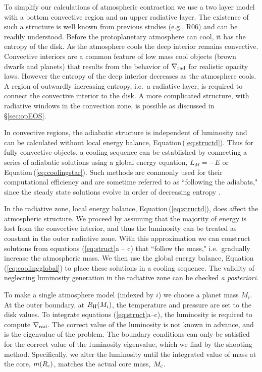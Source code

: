 \documentclass[apj, numberedappendix]{emulateapj}
\newcommand{\Eq}[1]{Equation\,(\ref{#1})}
\newcommand{\delrad}{\nabla_{\rm rad}}
\newcommand{\RH}{R_{\rm H}}
\newcommand{\co}{_{\rm c}}
\begin{document}
To simplify our calculations of atmospheric contraction we use a two layer model with a bottom convective region and an upper radiative layer.   The existence of such a structure is well known from previous studies (e.g., R06) and can be readily understood.  Before the protoplanetary atmosphere can cool, it has the entropy of the disk.  As the atmosphere cools the deep interior remains convective.  Convective interiors are a common feature of low mass cool objects (brown dwarfs and planets) that results from the behavior of $\delrad$ for realistic opacity laws.  However the entropy of the deep interior decreases as the atmosphere cools.  A region of outwardly increasing entropy, i.e.\ a radiative layer, is required to connect the convective interior to the disk.  A more complicated structure, with radiative windows in the convection zone, is possible as discussed in \S\ref{sec:opEOS}. 

In convective regions, the adiabatic structure is independent of luminosity and can be calculated without local energy balance, \Eq{eq:structd}.  Thus for fully convective objects, a cooling sequence can be established by connecting a series of adiabatic solutions using a global energy equation, $L_M = -\dot{E}$ or \Eq{eq:coolingstar}.  Such methods are commonly used for their computational efficiency and are sometime referred to as ``following the adiabats," since the steady state solutions evolve in order of decreasing entropy \citep{marleau13}.

In the radiative zone,  local energy balance, \Eq{eq:structd}, does affect the atmospheric structure.  We proceed by assuming that the majority of energy is lost from the convective interior, and thus the luminosity can be treated as constant in the outer radiative zone.  With this approximation we can construct solutions from equations (\ref{eq:struct}a -- c) that ``follow the mass," i.e.\ gradually increase the atmospheric mass.  We then use the global energy balance, \Eq{eq:coolingglobal} to place these solutions in a cooling sequence.  The validity of neglecting luminosity generation in the radiative zone can be checked \emph{a posteriori}.

To make a single atmosphere model (indexed by $i$) we choose a planet mass $M_i$.  At the outer boundary, at $\RH(M_i)$, the temperature and pressure are set to the disk values.  To integrate equations (\ref{eq:struct}a--c), the luminosity is required to compute $\delrad$.  The correct value of the luminosity is not known in advance, and is the eigenvalue of the problem.  The boundary conditions can only be satisfied for the correct value of the luminosity eigenvalue, which we find by the shooting method.  Specifically, we alter the luminosity until the integrated value of mass at the core, $m(R\co)$, matches the actual core mass, $M\co$.
\end{document}
